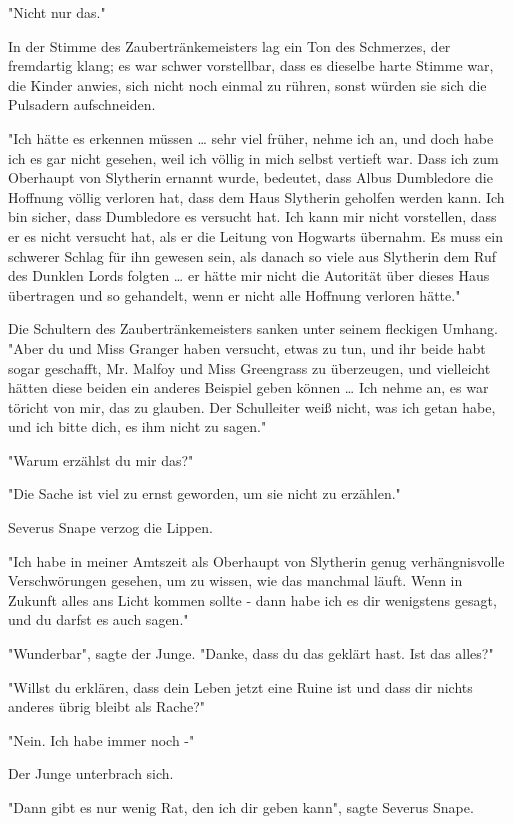 {"Nicht nur das."

In der Stimme des Zaubertränkemeisters lag ein Ton des Schmerzes, der fremdartig klang; es war schwer vorstellbar, dass es dieselbe harte Stimme war, die Kinder anwies, sich nicht noch einmal zu rühren, sonst würden sie sich die Pulsadern aufschneiden.

"Ich hätte es erkennen müssen … sehr viel früher, nehme ich an, und doch habe ich es gar nicht gesehen, weil ich völlig in mich selbst vertieft war. Dass ich zum Oberhaupt von Slytherin ernannt wurde, bedeutet, dass Albus Dumbledore die Hoffnung völlig verloren hat, dass dem Haus Slytherin geholfen werden kann. Ich bin sicher, dass Dumbledore es versucht hat. Ich kann mir nicht vorstellen, dass er es nicht versucht hat, als er die Leitung von Hogwarts übernahm. Es muss ein schwerer Schlag für ihn gewesen sein, als danach so viele aus Slytherin dem Ruf des Dunklen Lords folgten … er hätte mir nicht die Autorität über dieses Haus übertragen und so gehandelt, wenn er nicht alle Hoffnung verloren hätte."

Die Schultern des Zaubertränkemeisters sanken unter seinem fleckigen Umhang. "Aber du und Miss Granger haben versucht, etwas zu tun, und ihr beide habt sogar geschafft, Mr. Malfoy und Miss Greengrass zu überzeugen, und vielleicht hätten diese beiden ein anderes Beispiel geben können … Ich nehme an, es war töricht von mir, das zu glauben. Der Schulleiter weiß nicht, was ich getan habe, und ich bitte dich, es ihm nicht zu sagen."

"Warum erzählst du mir das?"

"Die Sache ist viel zu ernst geworden, um sie nicht zu erzählen."

Severus Snape verzog die Lippen.

"Ich habe in meiner Amtszeit als Oberhaupt von Slytherin genug verhängnisvolle Verschwörungen gesehen, um zu wissen, wie das manchmal läuft. Wenn in Zukunft alles ans Licht kommen sollte - dann habe ich es dir wenigstens gesagt, und du darfst es auch sagen."

"Wunderbar", sagte der Junge. "Danke, dass du das geklärt hast. Ist das alles?"

"Willst du erklären, dass dein Leben jetzt eine Ruine ist und dass dir nichts anderes übrig bleibt als Rache?"

"Nein. Ich habe immer noch -"

Der Junge unterbrach sich.

"Dann gibt es nur wenig Rat, den ich dir geben kann", sagte Severus Snape.

}
